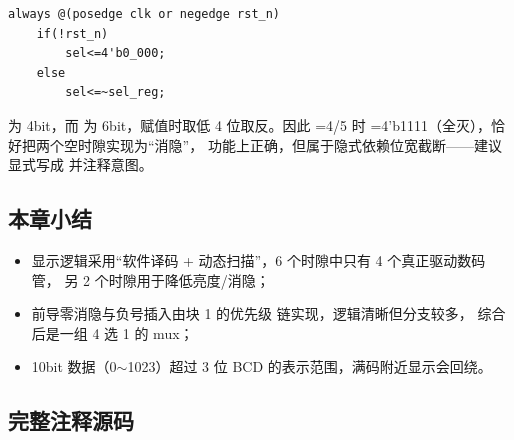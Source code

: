 \begin{lstlisting}[style=vsnip]
always @(posedge clk or negedge rst_n)
    if(!rst_n)
        sel<=4'b0_000;
    else
        sel<=~sel_reg;
\end{lstlisting}

 为 4bit，而  为 6bit，赋值时取低 4 位取反。因此
=4/5 时 =4'b1111（全灭），恰好把两个空时隙实现为“消隐”，
功能上正确，但属于隐式依赖位宽截断——建议显式写成  并注释意图。

\subsection{本章小结}

\begin{itemize}[leftmargin=2em,itemsep=2pt]
\item 显示逻辑采用“软件译码 + 动态扫描”，6 个时隙中只有 4 个真正驱动数码管，
      另 2 个时隙用于降低亮度/消隐；
\item 前导零消隐与负号插入由块 1 的优先级  链实现，逻辑清晰但分支较多，
      综合后是一组 4 选 1 的 mux；
\item 10bit 数据（0$\sim$1023）超过 3 位 BCD 的表示范围，满码附近显示会回绕。
\end{itemize}

\subsection{完整注释源码}


